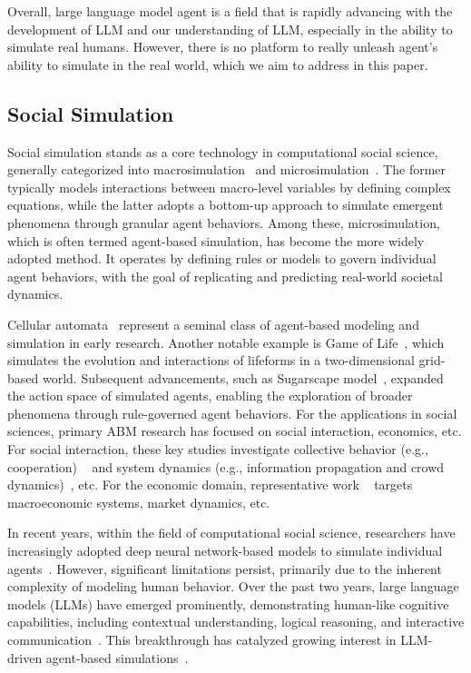 Overall, large language model agent is a field that is rapidly advancing with the development of LLM and our understanding of LLM, especially in the ability to simulate real humans. However, there is no platform to really unleash agent's ability to simulate in the real world, which we aim to address in this paper.



\subsection{Social Simulation}
Social simulation stands as a core technology in computational social science, generally categorized into macrosimulation~\cite{troitzsch1996social} and microsimulation~\cite{figari2021empirical}. The former typically models interactions between macro-level variables by defining complex equations, while the latter adopts a bottom-up approach to simulate emergent phenomena through granular agent behaviors. Among these, microsimulation, which is often termed agent-based simulation, has become the more widely adopted method. It operates by defining rules or models to govern individual agent behaviors, with the goal of replicating and predicting real-world societal dynamics.


Cellular automata~\cite{wolfram1983cellular} represent a seminal class of agent-based modeling and simulation in early research. Another notable example is Game of Life~\cite{conway1970game}, which simulates the evolution and interactions of lifeforms in a two-dimensional grid-based world. Subsequent advancements, such as Sugarscape model~\cite{epstein1996growing}, expanded the action space of simulated agents, enabling the exploration of broader phenomena through rule-governed agent behaviors.  For the applications in social sciences, primary ABM research has focused on social interaction, economics, etc. For social interaction, these key studies investigate collective behavior (e.g., cooperation) ~\cite{goldstone2005computational} and system dynamics (e.g., information propagation and crowd dynamics)~\cite{namatame2016agent}, etc. For the economic domain, representative work ~\cite{gallegati2012reconstructing,chen2012agent,axtell2022agent} targets macroeconomic systems, market dynamics, etc.

In recent years, within the field of computational social science, researchers have increasingly adopted deep neural network-based models to simulate individual agents~\cite{van2017deep,kavak2018big}. However, significant limitations persist, primarily due to the inherent complexity of modeling human behavior.  Over the past two years, large language models (LLMs) have emerged prominently, demonstrating human-like cognitive capabilities, including contextual understanding, logical reasoning, and interactive communication~\cite{orru2023human,lampinen2024language}. This breakthrough has catalyzed growing interest in LLM-driven agent-based simulations~\cite{gao2024large}.  

